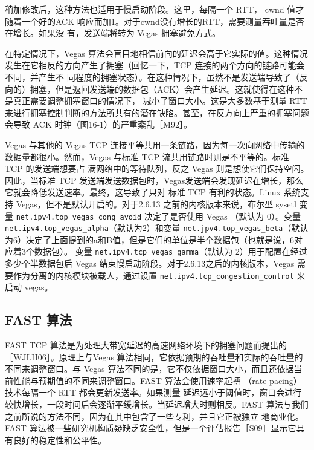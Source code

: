 稍加修改后，这种方法也适用于慢启动阶段。这里，每隔一个 RTT， cwnd 值才随着一个好的ACK 响应而加1。对于cwnd没有增长的RTT，需要测量吞吐量是否在增长。如果没
有，发送端将转为 Vegas 拥塞避免方式。

在特定情况下，Vegas 算法会盲目地相信前向的延迟会高于它实际的值。这种情况发生在它相反的方向产生了拥塞（回忆一下，TCP 连接的两个方向的链路可能会不同，并产生不
同程度的拥塞状态）。在这种情况下，虽然不是发送端导致了（反向的）拥塞，但是返回发送端的数据包（ACK）会产生延迟。这就使得在这种不是真正需要调整拥塞窗口的情况下，
减小了窗口大小。这是大多数基于测量 RTT来进行拥塞控制判断的方法所共有的潜在缺陷。甚至，在反方向上严重的拥塞问题会导致 ACK 时钟（图16-1）的严重紊乱［M92］。

Vegas 与其他的 Vegas TCP 连接平等共用一条链路，因为每一次向网络中传输的数据量都很小。然而，Vegas 与标准 TCP 流共用链路时则是不平等的。标准 TCP 的发送端想要占
满网络中的等待队列，反之 Vegas 则是想使它们保持空闲。因此，当标准 TCP 发送端发送数据包时，Vegas发送端会发现延迟在增长，那么它就会降低发送速率。最终，这导致了只对
标准 TCP 有利的状态。Linux 系统支持 Vegas，但不是默认开启的。对于2.6.13 之前的内核版本来说，布尔型 sysetl 变量 \verb|net.ipv4.top_vegas_cong_avoid| 决定了是否使用 Vegas （默认为
0）。变量 \verb|net.ipv4.top_vegas_alpha|（默认为2）和变量 \verb|net.jpv4.top_vegas_beta|（默认为6）决定了上面提到的a和B值，但是它们的单位是半个数据包（也就是说，6对应着3个数据包）。
变量 \verb|net.ipv4.tcp_vegas_gamma|（默认为 2）用于配置在经过多少个半数据包后 Vegas 结束慢启动阶段。对于2.6.13之后的内核版本，Vegas 需要作为分离的内核模块被载人，通过设置
\verb|net.ipv4.tcp_congestion_control| 来启动 vegas。

\subsection{FAST 算法}
FAST TCP 算法是为处理大带宽延迟的高速网络环境下的拥塞问题而提出的［WJLH06］。原理上与Vegas 算法相同，它依据预期的吞吐量和实际的吞吐量的不同来调整窗口。与
Vegas 算法不同的是，它不仅依据窗口大小，而且还依据当前性能与预期值的不同来调整窗口。FAST 算法会使用速率起搏 （rate-pacing）技术每隔一个 RTT 都会更新发送率。如果测量
延迟远小于阈值时，窗口会进行较快增长，一段时间后会逐渐平缓增长。当延迟增大时则相反。FAST 算法与我们之前所说的方法不同，因为在其中包含了一些专利，并且它正被独立
地商业化。FAST 算法被一些研究机构质疑缺乏安全性，但是一个评估报告［S09］显示它具有良好的稳定性和公平性。

